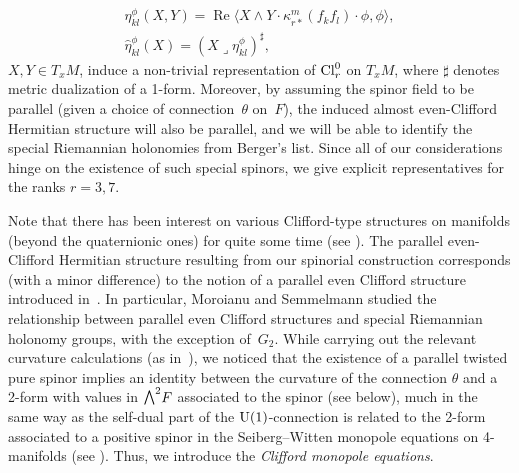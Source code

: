 \documentclass[pdftex]{sigma}
\newcommand{\ext}{\raise1pt\hbox{\small$\bigwedge$}}
\numberwithin{equation}{section}
\begin{document}
\begin{gather*}
 \eta_{kl}^\phi(X,Y) = \operatorname{Re}\langle X\wedge Y\cdot \kappa_{r*}^m(f_kf_l)\cdot \phi,\phi\rangle ,\\
 \hat\eta_{kl}^\phi(X) = (X\lrcorner\eta_{kl}^\phi)^\sharp,
\end{gather*}
$X,Y\in T_xM$, induce a non-trivial representation of ${\rm Cl}_r^0$ on $T_xM$, where $\sharp$ denotes metric dualization of a 1-form.
Moreover, by assuming the spinor field to be parallel (given a choice of connection~$\theta$ on~$F$),
the induced almost even-Clifford Hermitian structure will also be parallel,
and we will be able to identify the special Riemannian holonomies from Berger's list.
Since all of our considerations hinge on the existence of such special spinors, we give
explicit representatives for the ranks $r=3 , 7$.

Note that there has been interest on various Clifford-type structures on manifolds (beyond the quaternionic ones) for quite some time (see \cite{AGH,AH,AHS,Barberis,Burdujan1,Burdujan2,Console, Ferus,Friedrich1,GH,Moroianu-Hadfield, Joyce0,Lazaroiu1,Lazaroiu2,Moroianu-Pilca,Moroianu-Semmelmann,Nikolayevsky,Parton0,
Parton1, Parton2, Piccinni, Spindel}). The parallel even-Clifford Hermitian structure resulting from our spinorial construction corresponds (with a minor difference) to the notion of a parallel even Clifford structure introduced in~\cite{Moroianu-Semmelmann}. In particular, Moroianu and Semmelmann studied the relationship between parallel even Clifford structures and special Riemannian holonomy groups, with the exception of~$G_2$. While carrying out the relevant curvature calculations (as in~\cite{Moroianu-Semmelmann}), we noticed that the existence of a parallel twisted pure spinor implies an identity between the curvature of the connection $\theta$
and a 2-form with values in $\ext^2 F$ associated to the spinor (see below), much in the same way as the self-dual part of the ${\rm U}(1)$-connection is related to the
2-form associated to a positive spinor in the Seiberg--Witten monopole equations on 4-manifolds (see \cite{Morgan, Nicolaescu, Witten}). Thus, we introduce the {\em Clifford monopole equations}.
\end{document}
